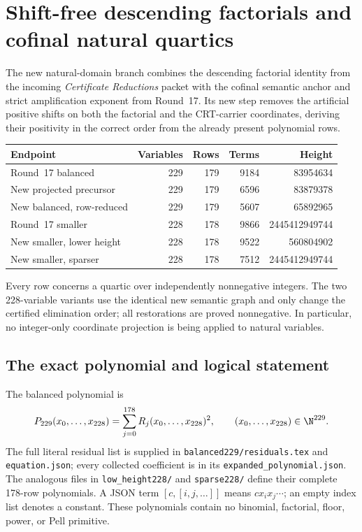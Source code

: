 \section{Shift-free descending factorials and cofinal natural quartics}
\label{sec:shift-free-natural}

The new natural-domain branch combines the descending factorial identity
from the incoming \emph{Certificate Reductions} packet with the cofinal
semantic anchor and strict amplification exponent from Round~17. Its new
step removes the artificial positive shifts on both the factorial and the
CRT-carrier coordinates, deriving their positivity in the correct order
from the already present polynomial rows.

\begin{center}
\begin{tabular}{lrrrr}
\hline
Endpoint & Variables & Rows & Terms & Height\\
\hline
Round~17 balanced &229&179&9184&83954634\\
New projected precursor &229&179&6596&83879378\\
New balanced, row-reduced &229&179&5607&65892965\\
Round~17 smaller &228&178&9866&2445412949744\\
New smaller, lower height &228&178&9522&560804902\\
New smaller, sparser &228&178&7512&2445412949744\\
\hline
\end{tabular}
\end{center}
Every row concerns a quartic over independently nonnegative integers.
The two 228-variable variants use the identical new semantic graph and
only change the certified elimination order; all restorations are proved
nonnegative. In particular, no integer-only coordinate projection is
being applied to natural variables.

\subsection{The exact polynomial and logical statement}
The balanced polynomial is
\[
 P_{229}(x_0,\ldots,x_{228})=\sum_{j=0}^{178}R_j(x_0,\ldots,x_{228})^2,
 \qquad (x_0,\ldots,x_{228})\in\N^{229}.
\]
The full literal residual list is supplied in
\texttt{balanced229/residuals.tex} and \texttt{equation.json}; every collected
coefficient is in its \texttt{expanded\_polynomial.json}. The analogous files
in \texttt{low\_height228/} and \texttt{sparse228/} define their complete
178-row polynomials. A JSON term \([c,[i,j,\ldots]]\) means
\(c x_i x_j\cdots\); an empty index list denotes a constant. These
polynomials contain no binomial, factorial, floor, power, or Pell primitive.


